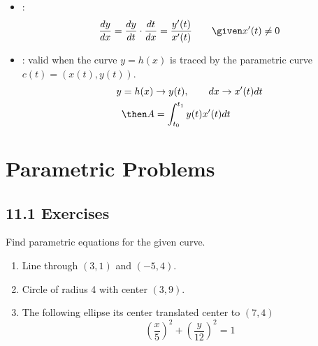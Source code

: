\begin{itemize}
  \item {}:
    \[%
      \frac{dy}{dx}  = \frac{dy}{dt} \cdot \frac{dt}{dx} = \frac{y'(t)}{x'(t)}
      \qquad \given x'(t) \neq 0
    \]%

  \item {}: valid when the curve \(y = h(x)\)
    is traced  by the parametric curve \(c(t) = (x(t), y(t))\).
    \begin{align*}
      y &= h(x) \to y(t), \qquad  dx \to x'(t) dt \\
      &\then A = \int_{t_0}^{t_1}  y(t)x'(t) dt
    \end{align*}


\end{itemize}

\section{Parametric Problems}
\subsection{11.1 Exercises}
Find parametric equations for the given curve.
\begin{enumerate}[itemsep=14em]
  \item Line through \((3,1)\) and \((-5, 4)\).

  \item Circle of radius 4 with center \((3, 9)\).

  \item The following ellipse its center translated center to \((7, 4)\)
    \[%
      \left( \frac{x}{5} \right)^2 + \left( \frac{y}{12} \right)^2 = 1
    \]%

\end{enumerate}
